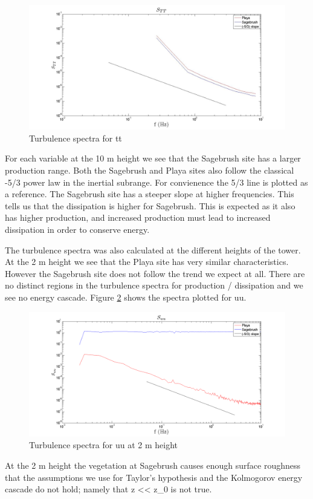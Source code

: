 \documentclass[]{article}
\begin{document}
\begin{figure}[h]
	\centering
	\includegraphics[width=\textwidth]{S_tt10m.jpg}
	\caption{Turbulence spectra for tt}
	\label{fig:S_tt10m}
\end{figure}

For each variable at the 10 m height we see that the Sagebrush site has a larger production range. Both the Sagebrush and Playa sites also follow the classical -5/3 power law in the inertial subrange. For convienence the 5/3 line is plotted as a reference. The Sagebrush site has a steeper slope at higher frequencies. This tells us that the dissipation is higher for Sagebrush. This is expected as it also has higher production, and increased production must lead to increased dissipation in order to conserve energy.

The turbulence spectra was also calculated at the different heights of the tower. At the 2 m height we see that the Playa site has very similar characteristics.  However the Sagebrush site does not follow the trend we expect at all. There are no distinct regions in the turbulence spectra for production / dissipation and we see no energy cascade. Figure \ref{fig:S_uu} shows the spectra plotted for uu.
\begin{figure}[h]
	\centering
	\includegraphics[width=\textwidth]{S_uu.png}
	\caption{Turbulence spectra for uu at 2 m height}
	\label{fig:S_uu}
\end{figure}
At the 2 m height the vegetation at Sagebrush causes enough surface roughness that the assumptions we use for Taylor's hypothesis and the Kolmogorov energy cascade do not hold; namely that z << z_0 is not true. 
\end{document}
